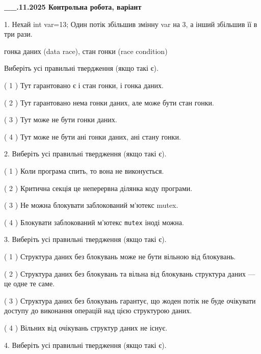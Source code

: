\documentclass[12pt, ukrainian]{article}
\def\code#1{\Verb!#1!}
\begin{document}
\begin {large}

\textbf{\_\_.11.2025 Контрольна робота, варіант  }\par


{
1. Нехай int var=13; Один потік збільшив змінну var на 3, а інший збільшив її в три рази.

гонка даних (data race), стан гонки (race condition)

Виберіть усі правильні твердження (якщо такі є).\par
\vspace{2mm}
( 1 ) Тут гарантовано є і стан гонки, і гонка даних.%

( 2 ) Тут гарантовано нема гонки даних, але може бути стан гонки.%

( 3 ) Тут може не бути гонки даних.%

( 4 ) Тут може не бути ані гонки даних, ані стану гонки.%


2. Виберіть усі правильні твердження (якщо такі є).\par
\vspace{2mm}

( 1 ) Коли програма спить, то вона не виконується.%

( 2 ) Критична секція це неперервна ділянка коду програми.%

( 3 ) Не можна блокувати заблокований м’ютекс mutex.%

( 4 ) Блокувати заблокований м’ютекс  \code{mutex} іноді можна.%


3. Виберіть усі правильні твердження (якщо такі є).\par
\vspace{2mm}

( 1 ) Структура даних без блокувань може не бути вільною від блокувань.%

( 2 ) Структура даних без блокувань та вільна від блокувань структура даних --- це одне те саме.%

( 3 ) Структура даних без блокувань гарантує, що жоден потік не буде очікувати доступу до виконання операцій над цією структурою даних.%

( 4 ) Вільних від очікувань структур даних не існує.%


4. Виберіть усі правильні твердження (якщо такі є).\par
\vspace{2mm}

}
\end{large}
\end{document}

